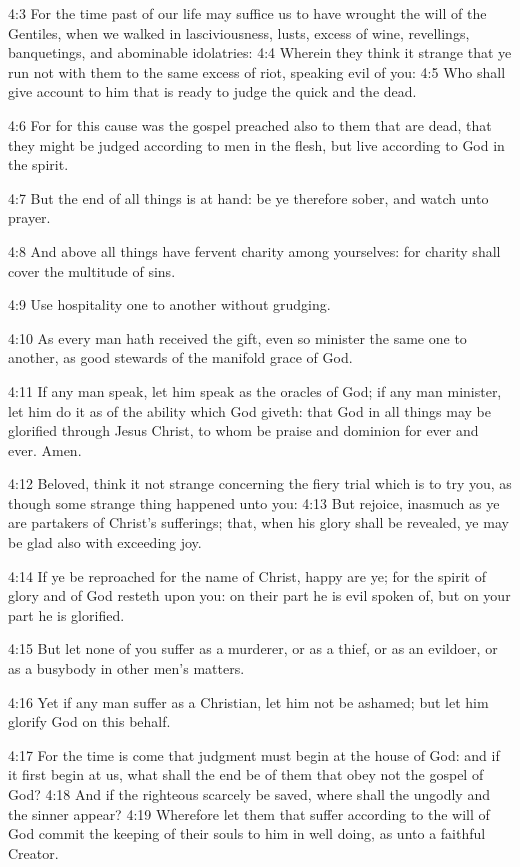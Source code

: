 4:3 For the time past of our life may suffice us to have wrought the
will of the Gentiles, when we walked in lasciviousness, lusts, excess
of wine, revellings, banquetings, and abominable idolatries: 4:4
Wherein they think it strange that ye run not with them to the same
excess of riot, speaking evil of you: 4:5 Who shall give account to
him that is ready to judge the quick and the dead.

4:6 For for this cause was the gospel preached also to them that are
dead, that they might be judged according to men in the flesh, but
live according to God in the spirit.

4:7 But the end of all things is at hand: be ye therefore sober, and
watch unto prayer.

4:8 And above all things have fervent charity among yourselves: for
charity shall cover the multitude of sins.

4:9 Use hospitality one to another without grudging.

4:10 As every man hath received the gift, even so minister the same
one to another, as good stewards of the manifold grace of God.

4:11 If any man speak, let him speak as the oracles of God; if any man
minister, let him do it as of the ability which God giveth: that God
in all things may be glorified through Jesus Christ, to whom be praise
and dominion for ever and ever. Amen.

4:12 Beloved, think it not strange concerning the fiery trial which is
to try you, as though some strange thing happened unto you: 4:13 But
rejoice, inasmuch as ye are partakers of Christ's sufferings; that,
when his glory shall be revealed, ye may be glad also with exceeding
joy.

4:14 If ye be reproached for the name of Christ, happy are ye; for the
spirit of glory and of God resteth upon you: on their part he is evil
spoken of, but on your part he is glorified.

4:15 But let none of you suffer as a murderer, or as a thief, or as an
evildoer, or as a busybody in other men's matters.

4:16 Yet if any man suffer as a Christian, let him not be ashamed; but
let him glorify God on this behalf.

4:17 For the time is come that judgment must begin at the house of
God: and if it first begin at us, what shall the end be of them that
obey not the gospel of God?  4:18 And if the righteous scarcely be
saved, where shall the ungodly and the sinner appear?  4:19 Wherefore
let them that suffer according to the will of God commit the keeping
of their souls to him in well doing, as unto a faithful Creator.

